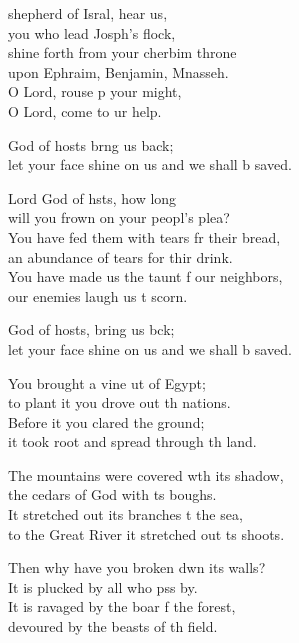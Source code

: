 \begin{psalmverse}
  \begin{patverse}
 shepherd of Isral, hear us,\Med\\
you who lead Josph’s flock,\\
shine forth from your cherbim throne\Med\\
upon Ephraim, Benjamin, Mnasseh.\\
O Lord, rouse p your might,\Med\\
O Lord, come to ur help.

God of hosts br\pointup{\i}ng us back;\Med\\
let your face shine on us and we shall b saved.

Lord God of hsts, how long\Med\\
will you frown on your peopl’s plea?\\
You have fed them with tears fr their bread,\Med\\
an abundance of tears for thir drink.\\
You have made us the taunt f our neighbors,\Med\\
our enemies laugh us t scorn.

God of hosts, bring us bck;\Med\\
let your face shine on us and we shall b saved.

You brought a vine ut of Egypt;\Med\\
to plant it you drove out th nations.\\
Before it you clared the ground;\Med\\
it took root and spread through th land.

The mountains were covered w\pointup{\i}th its shadow,\Med\\
the cedars of God with \pointup{\i}ts boughs.\\
It stretched out its branches t the sea,\Med\\
to the Great River it stretched out \pointup{\i}ts shoots.

Then why have you broken dwn its walls?\Med\\
It is plucked by all who pss by.\\
It is ravaged by the boar f the forest,\Med\\
devoured by the beasts of th field.


\end{patverse}
\end{psalmverse}
